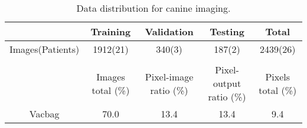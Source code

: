 \begin{table}[h]
\footnotesize
\caption{Data distribution for canine imaging.}
\centering
\begin{tabular}{c c c c c}
\hline\hline
& Training & Validation & Testing & Total  \\ [0.5ex]
\hline

Images(Patients) & 1912(21) & 340(3) & 187(2) & 2439(26) \\
 \\
 \hline\hline
		 & Images total (\%) & Pixel-image ratio (\%)& Pixel-output ratio (\%) & Pixels total (\%)\\ [0.5ex]
\hline
Vacbag   & 70.0& 13.4  & 13.4  &  9.4 \\

\hline\hline
\end{tabular}
\label{table:data_vet}
\end{table}
